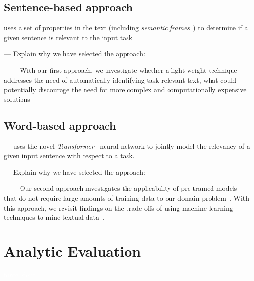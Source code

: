 \subsection{Sentence-based approach}


uses a set of properties in the text (including \textit{semantic frames}~\cite{fillmore1976frame}) to determine if a given sentence is relevant to the input task



--- Explain why we have selected the approach:

------ With our first approach, we investigate whether a light-weight technique addresses the need of automatically identifying task-relevant text, what could potentially discourage the need for more complex and computationally expensive solutions~\cite{Bavota2016}


\subsection{Word-based approach}


--- uses the novel \textit{Transformer}~\cite{Vaswani2017attention} neural network to jointly model the relevancy of a given input sentence with respect to a task. 

--- Explain why we have selected the approach:

------ Our second approach investigates the applicability of pre-trained models that do not require large amounts of training data to our domain problem~\cite{devlin2018bert, Ye2016}. With this approach, we revisit findings on the trade-offs of using machine learning techniques to mine textual data~\cite{Chaparro2017, Bavota2016}.



\clearpage



\section{Analytic Evaluation}
\textcolor{white}{force ident} %


